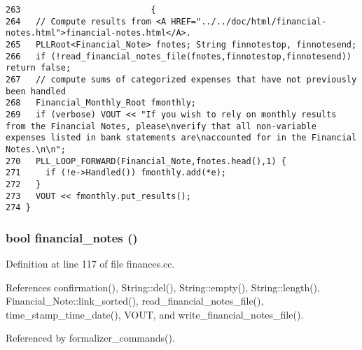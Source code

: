 \footnotesize\begin{verbatim}263                          {
264   // Compute results from <A HREF="../../doc/html/financial-notes.html">financial-notes.html</A>.
265   PLLRoot<Financial_Note> fnotes; String finnotestop, finnotesend;
266   if (!read_financial_notes_file(fnotes,finnotestop,finnotesend)) return false;
267   // compute sums of categorized expenses that have not previously been handled
268   Financial_Monthly_Root fmonthly;
269   if (verbose) VOUT << "If you wish to rely on monthly results from the Financial Notes, please\nverify that all non-variable expenses listed in bank statements are\naccounted for in the Financial Notes.\n\n";
270   PLL_LOOP_FORWARD(Financial_Note,fnotes.head(),1) {
271     if (!e->Handled()) fmonthly.add(*e);
272   }
273   VOUT << fmonthly.put_results();
274 }
\end{verbatim}\normalsize 
{}
\subsubsection{\setlength{\rightskip}{0pt plus 5cm}bool financial\_\-notes ()}\label{finances_8cc_a2}




Definition at line 117 of file finances.cc.

References confirmation(), String::del(), String::empty(), String::length(), Financial\_\-Note::link\_\-sorted(), read\_\-financial\_\-notes\_\-file(), time\_\-stamp\_\-time\_\-date(), VOUT, and write\_\-financial\_\-notes\_\-file().

Referenced by formalizer\_\-commands().



